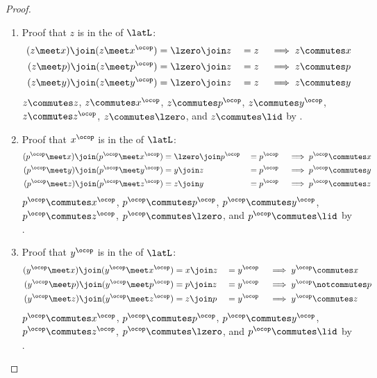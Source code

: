 \begin{proof}
\begin{enumerate}
  \item Proof that $z$ is in the  of $\latL$:
    \begin{align*}
      (z \meet x)       \join (z \meet x^\ocop)      &= \lzero \join z      &&= z  &&\implies z \commutes x       \\
      (z \meet p)       \join (z \meet p^\ocop)      &= \lzero \join z      &&= z  &&\implies z \commutes p       \\
      (z \meet y)       \join (z \meet y^\ocop)      &= \lzero \join z      &&= z  &&\implies z \commutes y       
    \end{align*}
    $z\commutes z$, $z\commutes x^\ocop$, $z\commutes p^\ocop$, $z\commutes y^\ocop$, $z \commutes z^\ocop$, $z\commutes\lzero$, and $z\commutes\lid$ by .

  \item Proof that $x^\ocop$ is in the  of $\latL$:
    \begin{align*}
      (p^\ocop \meet x)   \join (p^\ocop \meet x^\ocop)      &= \lzero \join p^\ocop      &&= p^\ocop  &&\implies p^\ocop \commutes x       \\
      (p^\ocop \meet y)   \join (p^\ocop \meet y^\ocop)      &= y \join z                 &&= p^\ocop  &&\implies p^\ocop \commutes y       \\
      (p^\ocop \meet z)   \join (p^\ocop \meet z^\ocop)      &= z \join y                 &&= p^\ocop  &&\implies p^\ocop \commutes z       \\
    \end{align*}
    $p^\ocop\commutes x^\ocop$, $p^\ocop\commutes p^\ocop$, $p^\ocop\commutes y^\ocop$, $p^\ocop\commutes z^\ocop$, $p^\ocop \commutes \lzero$, and $p^\ocop\commutes\lid$ by .

  \item Proof that $y^\ocop$ is in the  of $\latL$:
    \begin{align*}
      (y^\ocop \meet x)   \join (y^\ocop \meet x^\ocop)      &= x \join z  &&= y^\ocop  &&\implies y^\ocop \commutes x       \\
      (y^\ocop \meet p)   \join (y^\ocop \meet p^\ocop)      &= p \join z  &&= y^\ocop  &&\implies y^\ocop \notcommutes p       \\
      (y^\ocop \meet z)   \join (y^\ocop \meet z^\ocop)      &= z \join p  &&= y^\ocop  &&\implies y^\ocop \commutes z       \\
    \end{align*}
    $p^\ocop\commutes x^\ocop$, $p^\ocop\commutes p^\ocop$, $p^\ocop\commutes y^\ocop$, $p^\ocop\commutes z^\ocop$, $p^\ocop \commutes \lzero$, and $p^\ocop\commutes\lid$ by .


\end{enumerate}
\end{proof}
